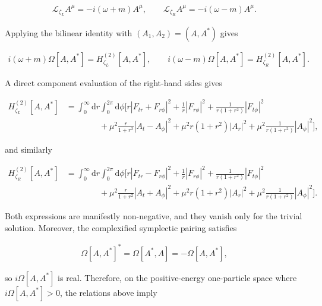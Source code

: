 \begin{align}
\mathcal{L}_{\zeta_{L}} A^{\mu} = - i (\omega + m) A^{\mu},
\qquad
\mathcal{L}_{\zeta_{R}} A^{\mu} = - i (\omega - m) A^{\mu}.
\end{align}

Applying the bilinear identity with $(A_{1},A_{2}) = (A, A^{*})$ gives

\begin{align}
i (\omega + m) \Omega[A, A^{*}] = H_{\zeta_{L}}^{(2)}[A, A^{*}],
\qquad
i (\omega - m) \Omega[A, A^{*}] = H_{\zeta_{R}}^{(2)}[A, A^{*}].
\end{align}

A direct component evaluation of the right-hand sides gives

\begin{align}
H_{\zeta_{L}}^{(2)}[A, A^{*}]
& = \int_{0}^{\infty} \mathrm{d}r \int_{0}^{2 \pi} \mathrm{d}\phi \Bigg[
r \left| F_{tr} + F_{r \phi} \right|^{2}
+ \frac{1}{r} \left| F_{r \phi} \right|^{2}
+ \frac{1}{r(1+r^{2})} \left| F_{t \phi} \right|^{2} \\
& \qquad \qquad
+ \mu^{2} \frac{r}{1+r^{2}} \left| A_{t} - A_{\phi} \right|^{2}
+ \mu^{2} r(1+r^{2}) \left| A_{r} \right|^{2}
+ \mu^{2} \frac{1}{r(1+r^{2})} \left| A_{\phi} \right|^{2}
\Bigg],
\end{align}

and similarly

\begin{align}
H_{\zeta_{R}}^{(2)}[A, A^{*}]
& = \int_{0}^{\infty} \mathrm{d}r \int_{0}^{2 \pi} \mathrm{d}\phi \Bigg[
r \left| F_{tr} - F_{r \phi} \right|^{2}
+ \frac{1}{r} \left| F_{r \phi} \right|^{2}
+ \frac{1}{r(1+r^{2})} \left| F_{t \phi} \right|^{2} \\
& \qquad \qquad
+ \mu^{2} \frac{r}{1+r^{2}} \left| A_{t} + A_{\phi} \right|^{2}
+ \mu^{2} r(1+r^{2}) \left| A_{r} \right|^{2}
+ \mu^{2} \frac{1}{r(1+r^{2})} \left| A_{\phi} \right|^{2}
\Bigg].
\end{align}

Both expressions are manifestly non-negative, and they vanish only for the trivial solution. Moreover, the complexified symplectic pairing satisfies

\begin{align}
\Omega[A, A^{*}]^{*} = \Omega[A^{*}, A] = - \Omega[A, A^{*}],
\end{align}

so $i \Omega[A, A^{*}]$ is real. Therefore, on the positive-energy one-particle space where $i \Omega[A, A^{*}] > 0$, the relations above imply

